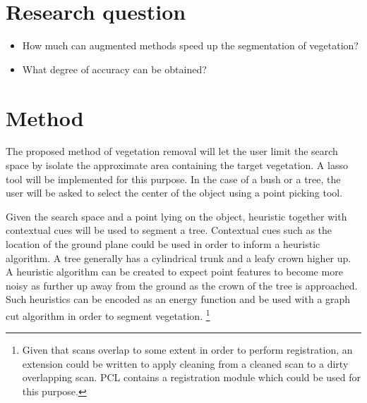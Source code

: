 \documentclass[10pt,twocolumn]{article}
\begin{document}


\section{Research question}
\begin{itemize}
\item How much can augmented methods speed up the segmentation of vegetation?
\item What degree of accuracy can be obtained?
\end{itemize}

\section{Method}
The proposed method of vegetation removal will let the user limit the search space by isolate the approximate area containing the target vegetation. A lasso tool will be implemented for this purpose. In the case of a bush or a tree, the user will be asked to select the center of the object using a point picking tool. 

Given the search space and a point lying on the object, heuristic together with contextual cues will be used to segment a tree. Contextual cues such as the location of the ground plane could be used in order to inform a heuristic algorithm. A tree generally has a cylindrical trunk and a leafy crown higher up. A heuristic algorithm can be created to expect point features to become more noisy as further up away from the ground as the crown of the tree is approached. Such heuristics can be encoded as an energy function and be used with a graph cut algorithm in order to segment vegetation. \footnote{Given that scans overlap to some extent in order to perform registration, an extension could be written to apply cleaning from a cleaned scan to a dirty overlapping scan. PCL contains a registration module which could be used for this purpose.}
\end{document}
